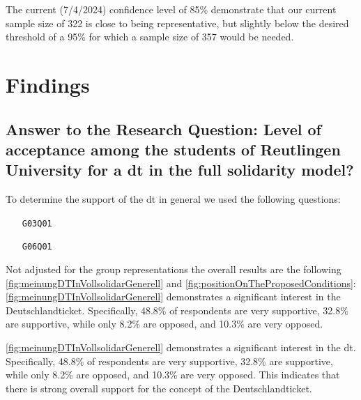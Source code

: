The current (7/4/2024) confidence level of 85\% demonstrate that our current sample size of 322 is close to being representative, but slightly below the desired threshold of a 95\% for which a sample size of 357 would be needed.  

\pagebreak
\section{Findings}
\subsection{Answer to the Research Question: Level of acceptance among the students of Reutlingen University for a \acrshort{dt} in the full solidarity model?}
\begin{center}
\end{center}

To determine the support of the \acrshort{dt} in general we used the following questions:

\begin{enumerate}
    \item[\texttt{G03Q01}] 
    \item[\texttt{G06Q01}] 
\end{enumerate}

Not adjusted for the group representations the overall results are the following \ref{fig:meinungDTInVollsolidarGenerell} and \ref{fig:positionOnTheProposedConditions}:
\ref{fig:meinungDTInVollsolidarGenerell} demonstrates a significant interest in the Deutschlandticket. Specifically, 48.8\% of respondents are very supportive, 32.8\% are supportive, while only 8.2\% are opposed, and 10.3\% are very opposed.

\ref{fig:meinungDTInVollsolidarGenerell} demonstrates a significant interest in the \acrshort{dt}. Specifically, 48.8\% of respondents are very supportive, 32.8\% are supportive, while only 8.2\% are opposed, and 10.3\% are very opposed. This indicates that there is strong overall support for the concept of the Deutschlandticket.

